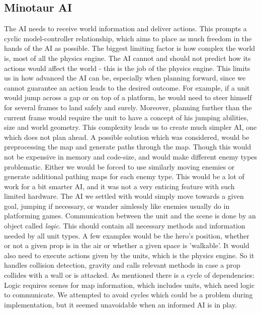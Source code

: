 \subsection*{Minotaur AI} %
The AI needs to receive world information and deliver actions. This prompts a cyclic model-controller relationship, which aims to place as much freedom in the hands of the AI as possible. The biggest limiting factor is how complex the world is, most of all the physics engine. The AI cannot and should not predict how its actions would affect the world - this is the job of the physics engine. This limits us in how advanced the AI can be, especially when planning forward, since we cannot guarantee an action leads to the desired outcome. For example, if a unit would jump across a gap or on top of a platform, he would need to steer himself for several frames to land safely and surely. Moreover, planning further than the current frame would require the unit to have a concept of his jumping abilities, size and world geometry.
\newline
This complexity leads us to create much simpler AI, one which does not plan ahead. A possible solution which was considered, would be preprocessing the map and generate paths through the map. Though this would not be expensive in memory and code-size, and would make different enemy types problematic. Either we would be forced to use similarly moving enemies or generate additional pathing maps for each enemy type. This would be a lot of work for a bit smarter AI, and it was not a very enticing feature with such limited hardware.
\newline
The AI we settled with would simply move towards a given goal, jumping if necessary, or wander aimlessly like enemies usually do in platforming games.
\newline
Communication between the unit and the scene is done by an object called \emph{logic}. This should contain all necessary methods and information needed by all unit types. A few examples would be the hero's position, whether or not a given prop is in the air or whether a given space is 'walkable'. It would also need to execute actions given by the units, which is the physics engine. So it handles collision detection, gravity and calls relevant methods in case a prop collides with a wall or is attacked.
\newline
As mentioned there is a cycle of dependencies: Logic requires scenes for map information, which includes units, which need logic to communicate. We attempted to avoid cycles which could be a problem during implementation, but it seemed unavoidable when an informed AI is in play.

